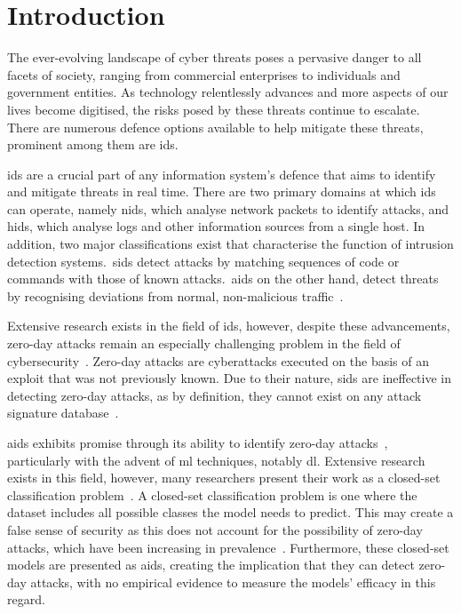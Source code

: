 \chapter{Introduction}%
\label{chp:introduction}

The ever-evolving landscape of cyber threats poses a pervasive danger to all
facets of society, ranging from commercial enterprises to individuals and
government entities. As technology relentlessly advances and more aspects of
our lives become digitised, the risks posed by these threats continue to
escalate. There are numerous defence options available to help mitigate these
threats, prominent among them are \gls{ids}.

\gls{ids} are a crucial part of any information system's defence that aims to
identify and mitigate threats in real time. There are two primary domains at
which \gls{ids} can operate, namely \gls{nids}, which analyse
network packets to identify attacks, and \gls{hids}, which analyse logs and
other information sources from a single host. In addition, two major
classifications exist that characterise the function of intrusion detection
systems.\ \gls{sids} detect attacks by matching sequences of code or commands
with those of known attacks.\ \gls{aids} on the other hand, detect threats by
recognising deviations from normal, non-malicious traffic~\cite{survey1}.

Extensive research exists in the field of \gls{ids}, however, despite these
advancements, zero-day attacks remain an especially challenging problem in the
field of cybersecurity~\cite{zero-day}. Zero-day attacks are cyberattacks
executed on the basis of an exploit that was not previously known. Due to their
nature, \gls{sids} are ineffective in detecting zero-day attacks, as by
definition, they cannot exist on any attack signature database~\cite{survey1}.

\gls{aids} exhibits promise through its ability to identify zero-day
attacks~\cite{aids-zero-day}, particularly with the advent of \gls{ml}
techniques, notably \gls{dl}. Extensive research exists in this field, however,
many researchers present their work as a closed-set classification
problem~\cite{zero-day}. A closed-set classification problem is one where the
dataset includes all possible classes the model needs to predict. This may
create a false sense of security as this does not account for the possibility
of zero-day attacks, which have been increasing in prevalence~\cite{symantec2017}.
Furthermore, these closed-set models are presented as \gls{aids}, creating the
implication that they can detect zero-day attacks, with no empirical evidence
to measure the models' efficacy in this regard.
